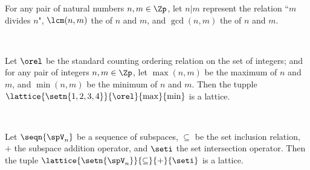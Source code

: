 \begin{minipage}{\tw-40mm}%
\begin{example}
\label{ex:lat_235}
\footnotemark
For any pair of natural numbers $n,m\in\Zp$,
let $n|m$ represent the relation ``$m$ divides $n$",
$\lcm(n,m)$ the  of $n$ and $m$, and
$\gcd(n,m)$ the  of $n$ and $m$.
\end{example}%
\end{minipage}%
\hfill%
%
\hfill{}\hfill\mbox{}\\%

\begin{minipage}{\tw-40mm}%
  \begin{example}
  \label{ex:lat_1234}
  Let $\orel$ be the standard counting ordering relation on the set of integers;
  and for any pair of integers $n,m\in\Zp$,
  let $\max(n,m)$ be the maximum of $n$ and $m$,
  and $\min(n,m)$ be the minimum of $n$ and $m$.
  Then the tupple $\lattice{\setn{1,2,3,4}}{\orel}{\max}{\min}$
  is a lattice.
  \end{example}
\end{minipage}%
\hfill{}\hfill\mbox{}\\%

\begin{minipage}[c]{\tw-40mm}
\begin{example}
\footnotemark
Let $\seqn{\spV_n}$ be a sequence of subspaces,
$\subseteq$ be the set inclusion relation,
$+$ the subspace addition operator,
and $\seti$ the set intersection operator.
Then the tuple $\lattice{\setn{\spV_n}}{\subseteq}{+}{\seti}$
is a lattice.
\end{example}
\end{minipage}%
%
\hfill{}\hfill\mbox{}\\%

